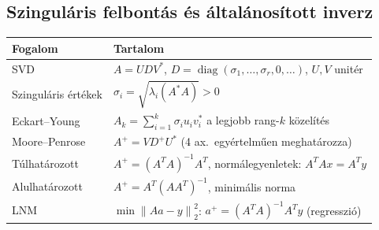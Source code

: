 \documentclass[a4paper,12pt]{article}
\theoremstyle{mydef}
\newcommand{\norm}[1]{\left\|#1\right\|}
\DeclareMathOperator{\diag}{diag}
\begin{document}
\subsection*{Szinguláris felbontás és általánosított inverz}

\begin{center}
\renewcommand{\arraystretch}{1.4}
\begin{tabular}{l|l}
\toprule
\textbf{Fogalom} & \textbf{Tartalom} \\
\midrule
SVD & $A = UDV^*$, $D = \diag(\sigma_1,\ldots,\sigma_r,0,\ldots)$, $U,V$ unitér \\
Szinguláris értékek & $\sigma_i = \sqrt{\lambda_i(A^*A)} > 0$ \\
Eckart--Young & $A_k = \sum_{i=1}^k \sigma_i u_i v_i^*$ a legjobb rang-$k$ közelítés \\
Moore--Penrose & $A^+ = VD^+U^*$ (4 ax.\ egyértelműen meghatározza) \\
Túlhatározott & $A^+ = (A^TA)^{-1}A^T$, normálegyenletek: $A^TAx = A^Ty$ \\
Alulhatározott & $A^+ = A^T(AA^T)^{-1}$, minimális norma \\
LNM & $\min \norm{Aa-y}_2^2$: $a^+ = (A^TA)^{-1}A^Ty$ (regresszió) \\
\bottomrule
\end{tabular}
\end{center}
\end{document}
